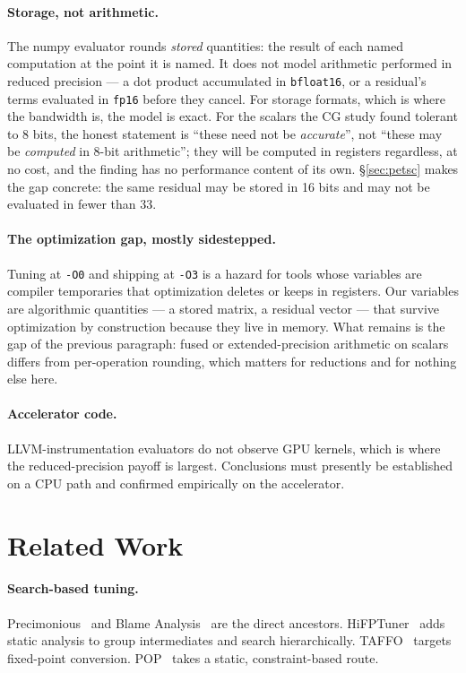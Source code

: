 \documentclass[11pt]{article}
\begin{document}
\paragraph{Storage, not arithmetic.} The numpy evaluator rounds \emph{stored}
quantities: the result of each named computation at the point it is named. It
does not model arithmetic performed in reduced precision --- a dot product
accumulated in \texttt{bfloat16}, or a residual's terms evaluated in
\texttt{fp16} before they cancel. For storage formats, which is where the
bandwidth is, the model is exact. For the scalars the CG study found tolerant to
8 bits, the honest statement is ``these need not be \emph{accurate}'', not
``these may be \emph{computed} in 8-bit arithmetic''; they will be computed in
registers regardless, at no cost, and the finding has no performance content of
its own. \S\ref{sec:petsc} makes the gap concrete: the same residual may be
stored in 16 bits and may not be evaluated in fewer than 33.

\paragraph{The optimization gap, mostly sidestepped.} Tuning at \texttt{-O0} and
shipping at \texttt{-O3} is a hazard for tools whose variables are compiler
temporaries
that optimization deletes or keeps in registers. Our variables are algorithmic
quantities --- a stored matrix, a residual vector --- that survive optimization
by construction because they live in memory. What remains is the gap of the previous
paragraph: fused or extended-precision arithmetic on scalars differs from
per-operation rounding, which matters for reductions and for nothing else here.

\paragraph{Accelerator code.} LLVM-instrumentation evaluators do not observe GPU
kernels, which is where the reduced-precision payoff is largest. Conclusions must
presently be established on a CPU path and confirmed empirically on the
accelerator.

\section{Related Work}

\paragraph{Search-based tuning.} Precimonious~\cite{precimonious} and Blame
Analysis~\cite{blame} are the direct ancestors. HiFPTuner~\cite{hifptuner} adds
static analysis to group intermediates and search hierarchically.
TAFFO~\cite{taffo} targets fixed-point conversion. POP~\cite{pop} takes a static,
constraint-based route.
\end{document}
